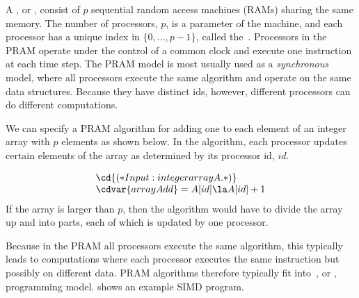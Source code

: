 \begin{cluster}
\label{grp:grm:analysis::models::pram-model}

\begin{gram}
\label{grm:analysis::models::pram-model}
A , or , 
consist of $p$ sequential random access machines
(RAMs) sharing  the same memory.
The number of processors, $p$, is a parameter of the machine,
and each processor has a unique index in $\{0, \dots, p-1\}$,
called the~.
Processors in the PRAM operate under the control of a common
clock and execute one instruction at each time step.
The PRAM model is most usually used as a {\em synchronous} model,
where all processors execute the same algorithm and operate on the same
data structures.
Because they have distinct ids, however, different processors can do
different computations.

\end{gram}
\end{cluster}

\begin{cluster}
\label{grp:ex:analysis::models::pram-array-add}

\begin{example}
\label{ex:analysis::models::pram-array-add}
We can specify a PRAM algorithm for adding one to each element of an
integer array with $p$ elements as shown below.  In the algorithm,
each processor updates certain elements of the array as determined by
its processor id, $id$.

\[
\begin{array}{l}
\cd{(* Input: integer array A. *)}
\\
\cdvar{arrayAdd} =  A[id] \la A[id]+1
\end{array}
\]
If the array is larger than $p$, then the algorithm would have to
divide the array up and into parts, each of which is updated by one
processor.

\end{example}
\end{cluster}

\begin{cluster}
\label{grp:grm:analysis::models::simd-model}

\begin{gram}
\label{grm:analysis::models::simd-model}
Because in the PRAM all processors execute the same algorithm, this
typically leads to computations where each processor executes the same
instruction but possibly on different data.   PRAM algorithms
therefore typically fit into~, or , programming model.
 shows an example SIMD program.

\end{gram}
\end{cluster}

